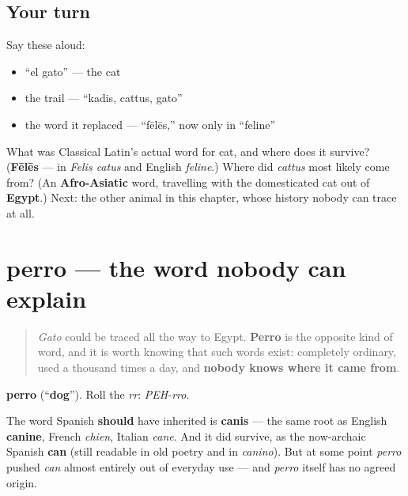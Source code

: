 \subsection*{Your turn}
Say these aloud:

\begin{itemize}
\raggedright
  \item \textquotedblleft{}el gato\textquotedblright{} — the cat
  \item the trail — \textquotedblleft{}kadis, cattus, gato\textquotedblright{}
  \item the word it replaced — \textquotedblleft{}fēlēs,\textquotedblright{} now only in \textquotedblleft{}feline\textquotedblright{}
\end{itemize}

\begin{tcolorbox}[breakable,colback=teal!4,colframe=teal!35!black,title={Before you move on}]
What was Classical Latin's actual word for cat, and where does it survive? (\textbf{Fēlēs} — in \emph{Felis catus} and English \emph{feline}.) Where did \emph{cattus} most likely come from? (An \textbf{Afro-Asiatic} word, travelling with the domesticated cat out of \textbf{Egypt}.) Next: the other animal in this chapter, whose history nobody can trace at all.
\end{tcolorbox}
\section[perro]{perro — the word nobody can explain}

\label{lesson:ES-C32-perro}



\begin{quote}
\emph{Gato} could be traced all the way to Egypt. \textbf{Perro} is the opposite kind of word, and it is worth knowing that such words exist: completely ordinary, used a thousand times a day, and \textbf{nobody knows where it came from}.
\end{quote}

\begin{cousinweb}
\textbf{perro} (\textquotedblleft{}\textbf{dog}\textquotedblright{}). Roll the \emph{rr}: \emph{PEH-rro}.

The word Spanish \textbf{should} have inherited is \textbf{canis} — the same root as English \textbf{canine}, French \emph{chien}, Italian \emph{cane}. And it did survive, as the now-archaic Spanish \textbf{can} (still readable in old poetry and in \emph{canino}). But at some point \emph{perro} pushed \emph{can} almost entirely out of everyday use — and \emph{perro} itself has no agreed origin.
\end{cousinweb}


